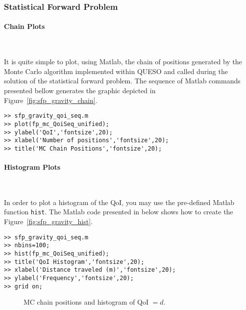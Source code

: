 \newpage

\subsubsection{Statistical Forward Problem}


\paragraph{Chain Plots} \

It is quite simple to plot, using Matlab, the chain of positions generated by the Monte Carlo algorithm implemented within QUESO and called during the solution of the statistical forward problem. 
The sequence of Matlab commands presented bellow generates the graphic depicted in Figure~\ref{fig:sfp_gravity_chain}. 

\begin{lstlisting}[label=matlab:chain_qoi,caption={Matlab code for the chain plot.}]
% inside Matlab
>> sfp_gravity_qoi_seq.m
>> plot(fp_mc_QoiSeq_unified);
>> ylabel('QoI','fontsize',20);
>> xlabel('Number of positions','fontsize',20);
>> title('MC Chain Positions','fontsize',20);
\end{lstlisting}


\paragraph{Histogram Plots} \

In order to plot a histogram of the QoI, you may use the pre-defined Matlab function \verb+hist+.
The Matlab code presented in below shows how to create the Figure~\ref{fig:sfp_gravity_hist}.

\begin{lstlisting}[label=matlab:hist_qoi,caption={Matlab code for the QoI histogram plot.}]
>> sfp_gravity_qoi_seq.m
>> nbins=100;
>> hist(fp_mc_QoiSeq_unified);
>> title('QoI Histogram','fontsize',20);
>> xlabel('Distance traveled (m)','fontsize',20);
>> ylabel('Frequency','fontsize',20);
>> grid on;
\end{lstlisting}

\begin{figure}[h]
\centering 
{}
\vspace{-6pt}
\caption{MC chain positions and histogram of QoI $=d$.}
\end{figure}

